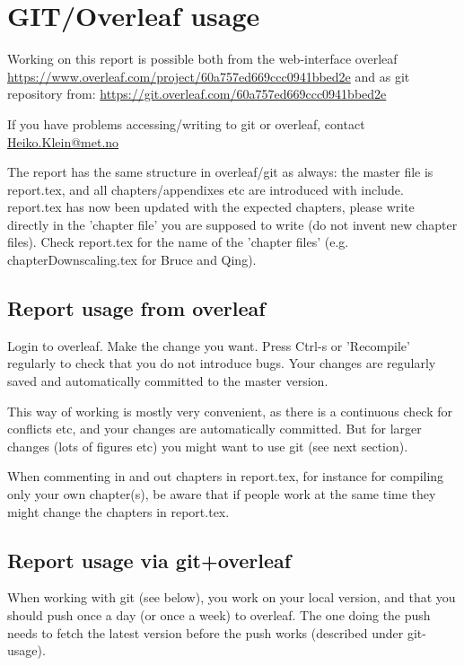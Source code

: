 \chapter{GIT/Overleaf usage}

Working on this report is possible both from the web-interface overleaf \url{https://www.overleaf.com/project/60a757ed669ccc0941bbed2e} and as git repository from: \url{https://git.overleaf.com/60a757ed669ccc0941bbed2e}

If you have problems accessing/writing to git or overleaf, contact \href{mailto:Heiko.Klein@met.no}{Heiko.Klein@met.no}


The report has the same structure in overleaf/git as always: the master file is report.tex, and all chapters/appendixes etc are introduced with include. report.tex has now been updated with the expected chapters, please write directly in the 'chapter file' you are supposed to write (do not invent new chapter files). Check report.tex for the name of the 'chapter files' (e.g. chapterDownscaling.tex for Bruce and Qing).

\section{Report usage from overleaf}

Login to overleaf. Make the change you want. Press Ctrl-s or 'Recompile' regularly to check that you do not introduce bugs. Your changes are regularly saved and automatically committed to the master version.

This way of working is mostly very convenient, as there is a continuous check for conflicts etc, and your changes are automatically committed. But for larger changes (lots of figures etc) you might want to use git (see next section). 

When commenting in and out chapters in report.tex, for instance for compiling only your own chapter(s), be aware that if people work at the same time they might change the chapters in report.tex.



\section{Report usage via git+overleaf}
When working with git (see below), you work on your local version, and that you should push once a day (or once a week) to overleaf. The one doing the push needs to fetch the latest version before the push works (described under git-usage). 

